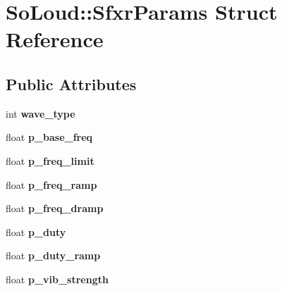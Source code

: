 \hypertarget{struct_so_loud_1_1_sfxr_params}{}\section{So\+Loud\+:\+:Sfxr\+Params Struct Reference}
\label{struct_so_loud_1_1_sfxr_params}
\subsection*{Public Attributes}
\begin{DoxyCompactItemize}
\item 
\mbox{\label{struct_so_loud_1_1_sfxr_params_acf3b1c33376a71154c1126f2b70ac464}} 
int {\bfseries wave\+\_\+type}
\item 
\mbox{\label{struct_so_loud_1_1_sfxr_params_a8b61e1ac8b4ba33a23c96a2be75596e3}} 
float {\bfseries p\+\_\+base\+\_\+freq}
\item 
\mbox{\label{struct_so_loud_1_1_sfxr_params_aef9a3be41efac9db3a31ed71898f684f}} 
float {\bfseries p\+\_\+freq\+\_\+limit}
\item 
\mbox{\label{struct_so_loud_1_1_sfxr_params_a95bb6db72da1b4be65e7ed1510bf0b8b}} 
float {\bfseries p\+\_\+freq\+\_\+ramp}
\item 
\mbox{\label{struct_so_loud_1_1_sfxr_params_aae295ff39a61937a057df41ac1b41c8b}} 
float {\bfseries p\+\_\+freq\+\_\+dramp}
\item 
\mbox{\label{struct_so_loud_1_1_sfxr_params_a02cbcdce2fde6cdf9752ca0ad35a806f}} 
float {\bfseries p\+\_\+duty}
\item 
\mbox{\label{struct_so_loud_1_1_sfxr_params_ac0ceb5dcbdbdd6f67fe428651c655658}} 
float {\bfseries p\+\_\+duty\+\_\+ramp}
\item 
\mbox{\label{struct_so_loud_1_1_sfxr_params_af3b6dcc8d6e55d60f137b6aa59b6860e}} 
float {\bfseries p\+\_\+vib\+\_\+strength}
\item 

\end{DoxyCompactItemize}
